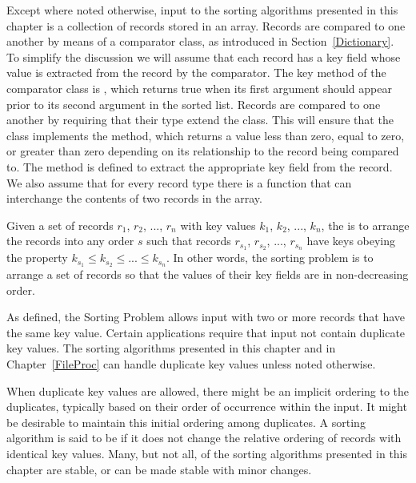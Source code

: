 Except where noted otherwise, input to the sorting algorithms
presented in this chapter is a collection of records stored in an
array.
{Records are compared to one another by means of a comparator class,
as introduced in Section~\ref{Dictionary}.
To simplify the discussion we will assume that each record has a
key field whose value is extracted from the record by the comparator.
The key method of the comparator class is , which returns
true when its first argument should appear prior to its second
argument in the sorted list.}{}
{Records are compared to one another by requiring that their type
extend the  class.
This will ensure that the class implements the 
method, which returns a value less than zero, equal to zero, or
greater than zero depending on its relationship to the record being
compared to.
The  method is defined to extract the appropriate key
field from the record.}{}
We also assume that for every record type there is a 
function that can interchange the contents of two records in the
array.

Given a set of records \(r_1\), \(r_2\), ..., \(r_n\)
with key values \(k_1\), \(k_2\), ..., \(k_n\),
the  is to
arrange the records into any order \(s\) such that records
\(r_{s_1}\), \(r_{s_2}\), ..., \(r_{s_n}\) have keys obeying the
property \(k_{s_1} \leq k_{s_2} \leq ... \leq k_{s_n}\). 
In other words, the sorting problem is to arrange a set of records so
that the values of their key fields are in non-decreasing order.

As defined, the Sorting Problem allows input with two or more
records that have the same key value.
Certain applications require that input not contain
duplicate key values.
The sorting algorithms presented in this chapter and in
Chapter~\ref{FileProc} can handle duplicate key values unless
noted otherwise.

When duplicate key values are allowed, there might be an implicit
ordering to the duplicates, typically based on their order of
occurrence within the input.
It might be desirable to maintain this initial ordering among
duplicates.
A sorting algorithm is said to be  if it does not change
the relative ordering of records with identical key values.
Many, but not all, of the sorting algorithms presented in this chapter
are stable, or can be made stable with minor changes.

